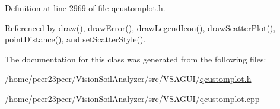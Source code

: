 Definition at line 2969 of file qcustomplot.\+h.



Referenced by draw(), draw\+Error(), draw\+Legend\+Icon(), draw\+Scatter\+Plot(), point\+Distance(), and set\+Scatter\+Style().



The documentation for this class was generated from the following files\+:\begin{DoxyCompactItemize}
\item 
/home/peer23peer/\+Vision\+Soil\+Analyzer/src/\+V\+S\+A\+G\+U\+I/\hyperlink{qcustomplot_8h}{qcustomplot.\+h}\item 
/home/peer23peer/\+Vision\+Soil\+Analyzer/src/\+V\+S\+A\+G\+U\+I/\hyperlink{qcustomplot_8cpp}{qcustomplot.\+cpp}\end{DoxyCompactItemize}
